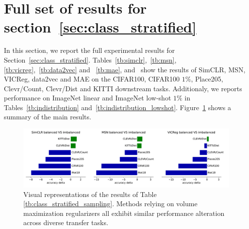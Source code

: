 \documentclass{article} %
\begin{document}
\section{Full set of results for section~\ref{sec:class_stratified}}
\label{apndx:classstratified_results}

In this section, we report the full experimental results for Section~\ref{sec:class_stratified}.
Tables~\ref{tb:simclr},~\ref{tb:msn},\ref{tb:vicreg},~\ref{tb:data2vec} and ~\ref{tb:mae},  and~ show the results of SimCLR, MSN, VICReg, data2vec and MAE on the CIFAR100, CIFAR100 $1\%$, Place205, Clevr/Count, Clevr/Dist and KITTI downstream tasks. Additionaly, we reports performance on ImageNet linear and ImageNet low-shot $1\%$ in Tables~\ref{tb:indistribution} and~\ref{tb:indistribution_lowshot}. Figure~\ref{fig:visu_class_stratified} shows a summary of the main results.

\begin{figure}[t]
    \centering
    \includegraphics[width=\textwidth]{assets/balanced_vs_imbalanced.pdf}
    \caption{Visual representations of the results of Table \ref{tb:class_stratified_sampling}. Methods relying on volume maximization regularizers all exhibit similar performance alteration across diverse transfer tasks.}
    \label{fig:visu_class_stratified}
\end{figure}
\end{document}
